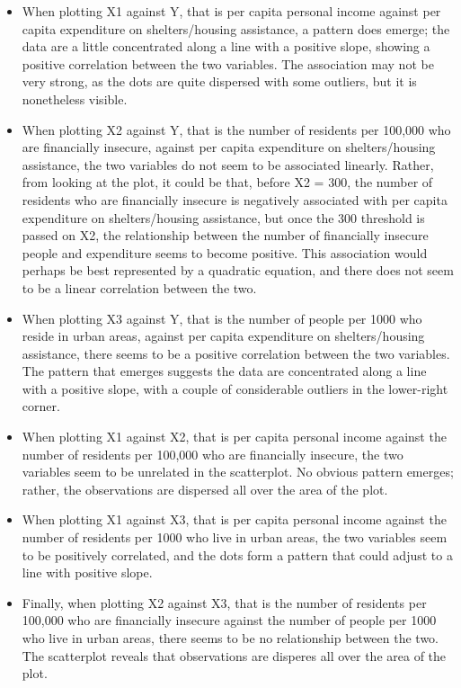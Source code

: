 \documentclass[12pt,letterpaper]{article}
\begin{document}
\begin{itemize}

\item When plotting X1 against Y, that is per capita personal income against per capita expenditure on shelters/housing assistance, a pattern does emerge; the data are a little concentrated along a line with a positive slope, showing a positive correlation between the two variables. The association may not be very strong, as the dots are quite dispersed with some outliers, but it is nonetheless visible. 

\item When plotting X2 against Y, that is the number of residents per 100,000 who are financially insecure, against per capita expenditure on shelters/housing assistance, the two variables do not seem to be associated linearly. Rather, from looking at the plot, it could be that, before X2 = 300, the number of residents who are financially insecure is negatively associated with per capita expenditure on shelters/housing assistance, but once the 300 threshold is passed on X2, the relationship between the number of financially insecure people and expenditure seems to become positive. This association would perhaps be best represented by a quadratic equation, and there does not seem to be a linear correlation between the two. 

\item When plotting X3 against Y, that is the number of people per 1000 who reside in urban areas, against per capita expenditure on shelters/housing assistance, there seems to be a positive correlation between the two variables. The pattern that emerges suggests the data are concentrated along a line with a positive slope, with a couple of considerable outliers in the lower-right corner. 

\item When plotting X1 against X2, that is per capita personal income against the number of residents per 100,000 who are financially insecure, the two variables seem to be unrelated in the scatterplot. No obvious pattern emerges; rather, the observations are dispersed all over the area of the plot. 

\item When plotting X1 against X3, that is per capita personal income against the number of residents per 1000 who live in urban areas, the two variables seem to be positively correlated, and the dots form a pattern that could adjust to a line with positive slope. 

\item Finally, when plotting X2 against X3, that is the number of residents per 100,000 who are financially insecure against the number of people per 1000 who live in urban areas, there seems to be no relationship between the two. The scatterplot reveals that observations are disperes all over the area of the plot. 

\end{itemize}
\end{document}
